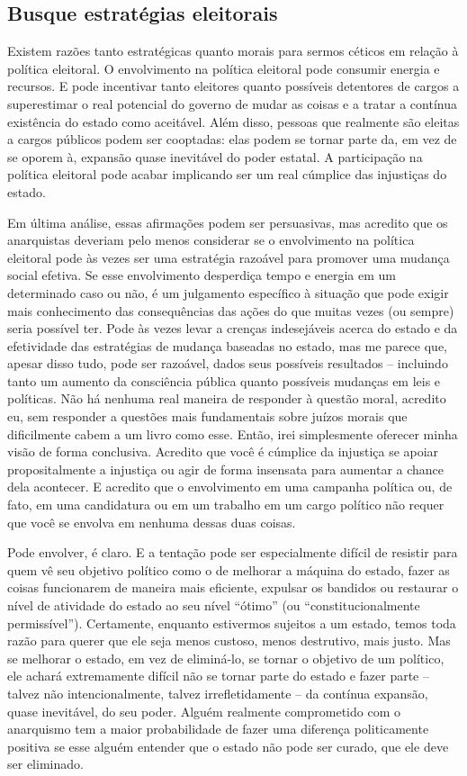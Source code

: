 \subsection*{Busque estratégias eleitorais}

Existem razões tanto estratégicas quanto morais para sermos céticos em relação à política eleitoral. O envolvimento na política eleitoral pode consumir energia e recursos. E pode incentivar tanto eleitores quanto possíveis detentores de cargos a superestimar o real potencial do governo de mudar as coisas e a tratar a contínua existência do estado como aceitável. Além disso, pessoas que realmente são eleitas a cargos públicos podem ser cooptadas: elas podem se tornar parte da, em vez de se oporem à, expansão quase inevitável do poder estatal. A participação na política eleitoral pode acabar implicando ser um real cúmplice das injustiças do estado.

Em última análise, essas afirmações podem ser persuasivas, mas acredito que os anarquistas deveriam pelo menos considerar se o envolvimento na política eleitoral pode às vezes ser uma estratégia razoável para promover uma mudança social efetiva. Se esse envolvimento desperdiça tempo e energia em um determinado caso ou não, é um julgamento específico à situação que pode exigir mais conhecimento das consequências das ações do que muitas vezes (ou sempre) seria possível ter. Pode às vezes levar a crenças indesejáveis acerca do estado e da efetividade das estratégias de mudança baseadas no estado, mas me parece que, apesar disso tudo, pode ser razoável, dados seus possíveis resultados -- incluindo tanto um aumento da consciência pública quanto possíveis mudanças em leis e políticas. Não há nenhuma real maneira de responder à questão moral, acredito eu, sem responder a questões mais fundamentais sobre juízos morais que dificilmente cabem a um livro como esse. Então, irei simplesmente oferecer minha visão de forma conclusiva. Acredito que você é cúmplice da injustiça se apoiar propositalmente a injustiça ou agir de forma insensata para aumentar a chance dela acontecer. E acredito que o envolvimento em uma campanha política ou, de fato, em uma candidatura ou em um trabalho em um cargo político não requer que você se envolva em nenhuma dessas duas coisas.

Pode envolver, é claro. E a tentação pode ser especialmente difícil de resistir para quem vê seu objetivo político como o de melhorar a máquina do estado, fazer as coisas funcionarem de maneira mais eficiente, expulsar os bandidos ou restaurar o nível de atividade do estado ao seu nível ``ótimo'' (ou ``constitucionalmente permissível''). Certamente, enquanto estivermos sujeitos a um estado, temos toda razão para querer que ele seja menos custoso, menos destrutivo, mais justo. Mas se melhorar o estado, em vez de eliminá-lo, se tornar o objetivo de um político, ele achará extremamente difícil não se tornar parte do estado e fazer parte -- talvez não intencionalmente, talvez irrefletidamente -- da contínua expansão, quase inevitável, do seu poder. Alguém realmente comprometido com o anarquismo tem a maior probabilidade de fazer uma diferença politicamente positiva se esse alguém entender que o estado não pode ser curado, que ele deve ser eliminado.

